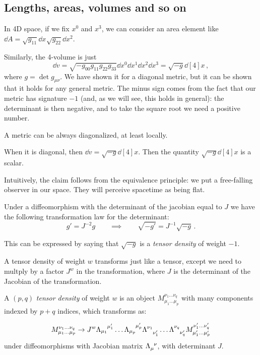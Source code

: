 \documentclass[main.tex]{subfiles}
\begin{document}
\subsection{Lengths, areas, volumes and so on}

In 4D space, if we fix \(x^{0}\) and \(x^{3}\), we can consider an area element like \(\dd{A} = \sqrt{g_{11}} \dd{x^{}} \sqrt{g_{22}} \dd{x^{2}} \).

Similarly, the 4-volume is just 
%
\begin{equation}
  \dd{v} 
  = \sqrt{-g_{00}g_{11}g_{22}g_{33}}
  \dd{x^{0}} \dd{x^{1}} \dd{x^{2}} \dd{x^{3}} 
  = \sqrt{-g}
  \dd[4]{x} 
\,,
\end{equation}
%
where \(g = \det g_{\mu \nu }\). We have shown it for a diagonal metric, but it can be shown that it holds for any general metric. The minus sign comes from the fact that our metric has signature \(-1\) (and, as we will see, this holds in general): the determinant is then negative, and to take the square root we need a positive number.

\begin{claim}[Unproven]
    A metric can be always diagonalized, at least locally.
\end{claim}

When it is diagonal, then \(\dd{v} = \sqrt{-g} \dd[4]{x} \). Then the quantity \(\sqrt{-g} \dd[4]{x} \) is a scalar.

Intuitively, the claim follows from the equivalence principle: we put a free-falling observer in our space. They will perceive spacetime as being flat.

Under a diffeomorphism with the determinant of the jacobian equal to \(J\) we have the following transformation law for the determinant: 
%
\begin{equation}
  g' = J^{-2} g
  \qquad \implies \qquad
  \sqrt{-g'}  = J^{-1} \sqrt{-g} 
\,.
\end{equation}
%

This can be expressed by saying that \(\sqrt{-g} \) is a \emph{tensor density} of weight \(-1\).

\begin{definition}
A tensor density of weight \(w\) transforms just like a tensor, except we need to multply by a factor \(J^{w}\) in the transformation, where \(J\) is the determinant of the Jacobian of the transformation.

A \((p, q)\) \emph{tensor density} of weight \(w\) is an object \(M_{\mu_1 \dots \mu_p}^{\nu_1 \dots \nu_q}\) with many components indexed by \(p+q\) indices, which transforms as:

\begin{equation}
    M_{\mu_1 \dots \mu_p}^{\nu_1 \dots \nu_q}
    \rightarrow
    J^{w}
    \tensor{\Lambda}{_{\mu_1}^{\mu'_1}}\dots
    \tensor{\Lambda}{_{\mu_p}^{\mu'_p}}
    \tensor{\Lambda}{^{\nu_1}_{\nu'_1}}\dots
    \tensor{\Lambda}{^{\nu_q}_{\nu'_q}}
    M_{\mu_1' \dots \mu_p'}^{\nu_1' \dots \nu_q'}
\end{equation}
%
under diffeomorphisms with Jacobian matrix \(\tensor{\Lambda}{_\mu^\nu}\), with determinant \(J\).
\end{definition}
\end{document}
